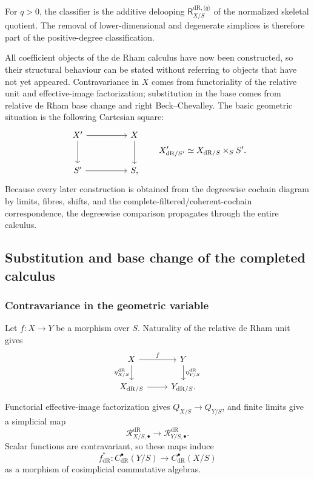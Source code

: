 \begin{remark}
For \(q>0\), the classifier is the additive delooping
\(\mathsf{R}^{\mathrm{dR},\langle q\rangle}_{X/S}\) of the normalized skeletal quotient. The removal of
lower-dimensional and degenerate simplices is therefore part of the positive-degree
classification.
\end{remark}


All coefficient objects of the de Rham calculus have now been constructed, so
their structural behaviour can be stated without referring to objects that
have not yet appeared. Contravariance in \(X\) comes from functoriality of the
relative unit and effective-image factorization; substitution in the base
comes from relative de Rham base change and right Beck--Chevalley. The basic
geometric situation is the following Cartesian square:
\[
\begin{tikzcd}[column sep=huge,row sep=large]
  X' \arrow[r] \arrow[d]
  & X \arrow[d]
  \\
  S' \arrow[r]
  & S,
\end{tikzcd}
\qquad
X'_{\mathrm{dR}/S'}
\simeq
X_{\mathrm{dR}/S}\times_SS'.
\]
Because every later construction is obtained from the degreewise cochain
diagram by limits, fibres, shifts, and the complete-filtered/coherent-cochain
correspondence, the degreewise comparison propagates through the entire
calculus.
\subsection{Substitution and base change of the completed calculus}
\subsubsection{Contravariance in the geometric variable}
\label{subsec:contravariance-geometric-variable}

Let \(f:X\to Y\) be a morphism over \(S\). Naturality of the relative de Rham
unit gives
\[
\begin{tikzcd}
X \ar[r,"f"] \ar[d,"\eta_{X/S}^{\mathrm{dR}}"']
  & Y \ar[d,"\eta_{Y/S}^{\mathrm{dR}}"]\\
X_{\mathrm{dR}/S} \ar[r]
  & Y_{\mathrm{dR}/S}.
\end{tikzcd}
\]
Functorial effective-image factorization gives
\(Q_{X/S}\to Q_{Y/S}\), and finite limits give a simplicial map
\[
  \mathcal R^{\mathrm{dR}}_{X/S,\bullet}
  \longrightarrow
  \mathcal R^{\mathrm{dR}}_{Y/S,\bullet}.
\]
Scalar functions are contravariant, so these maps induce
\[
  f^*_{\mathrm{dR}}:
  C^\bullet_{\mathrm{dR}}(Y/S)
  \longrightarrow
  C^\bullet_{\mathrm{dR}}(X/S)
\]
as a morphism of cosimplicial commutative algebras.


